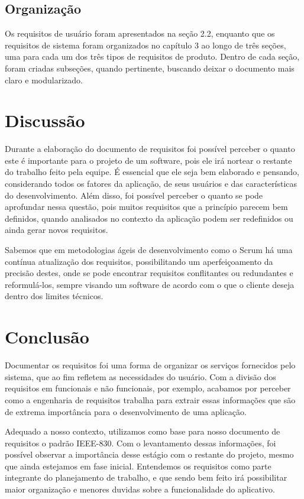 \documentclass[12pt]{article}
\begin{document}
\subsection{Organização}
Os requisitos de usuário foram apresentados na seção 2.2, enquanto que os requisitos de sistema foram organizados no capítulo 3 ao longo de três seções, uma para cada um dos três tipos de requisitos de produto. Dentro de cada seção, foram criadas subseções, quando pertinente, buscando deixar o documento mais claro e modularizado.

\section{Discussão}

Durante a elaboração do documento de requisitos foi possível perceber o quanto este é importante para o projeto de um software, pois ele irá nortear o restante do trabalho feito pela equipe. É essencial que ele seja bem elaborado e pensando, considerando todos os fatores da aplicação, de seus usuários e das características do desenvolvimento. Além disso, foi possível perceber o quanto se pode aprofundar nessa questão, pois muitos requisitos que a princípio parecem bem definidos, quando analisados no contexto da aplicação podem ser redefinidos ou ainda gerar novos requisitos.

Sabemos que em metodologias ágeis de desenvolvimento como o Scrum há uma contínua atualização dos requisitos, possibilitando um aperfeiçoamento da precisão destes, onde se pode encontrar requisitos conflitantes ou redundantes e reformulá-los, sempre visando um software de acordo com o que o cliente deseja dentro dos limites técnicos.



\section{Conclusão}
Documentar os requisitos foi uma forma de organizar os serviços fornecidos pelo sistema, que ao fim refletem as necessidades do usuário. Com a divisão dos requisitos em funcionais e não funcionais, por exemplo, acabamos por perceber como a engenharia de requisitos trabalha para extrair essas informações que são de extrema importância para o desenvolvimento de uma aplicação.

Adequado a nosso contexto, utilizamos como base para nosso documento de requisitos o padrão IEEE-830. Com o levantamento dessas informações, foi possível observar a importância desse estágio com o restante do projeto, mesmo que ainda estejamos em fase inicial. Entendemos os requisitos como parte integrante do planejamento de trabalho, e que sendo bem feito irá possibilitar maior organização e menores duvidas sobre a funcionalidade do aplicativo.
\end{document}
